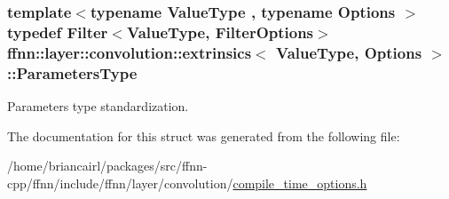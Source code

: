 \hypertarget{structffnn_1_1layer_1_1convolution_1_1extrinsics_a7f09ed7d5f347efd854649ac8ac22e21}{
\subsubsection[{Parameters\-Type}]{\setlength{\rightskip}{0pt plus 5cm}template$<$typename Value\-Type , typename Options $>$ typedef {\bf Filter}$<$Value\-Type, {\bf Filter\-Options}$>$ {\bf ffnn\-::layer\-::convolution\-::extrinsics}$<$ Value\-Type, Options $>$\-::{\bf Parameters\-Type}}}\label{structffnn_1_1layer_1_1convolution_1_1extrinsics_a7f09ed7d5f347efd854649ac8ac22e21}


Parameters type standardization. 



The documentation for this struct was generated from the following file\-:\begin{DoxyCompactItemize}
\item 
/home/briancairl/packages/src/ffnn-\/cpp/ffnn/include/ffnn/layer/convolution/\hyperlink{convolution_2compile__time__options_8h}{compile\-\_\-time\-\_\-options.\-h}\end{DoxyCompactItemize}
